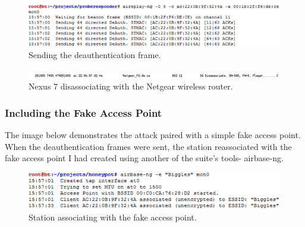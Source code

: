 \begin{figure}[h!]
\includegraphics[width=\linewidth]{research/attackvectors/figures/ddos-3.png}
\caption{Sending the deauthentication frame.}
\end{figure}

\begin{figure}[h!]
\includegraphics[width=\linewidth]{research/attackvectors/figures/ddos-4.png}
\caption{Nexus 7 disassociating with the Netgear wireless router.}
\end{figure}

\subsubsection*{Including the Fake Access Point}
The image below demonstrates the attack paired with a simple fake access point. When the deauthentication frames were sent, the station reassociated with the fake access point I had created using another of the suite’s tools- airbase-ng.

\begin{figure}[h!]
\includegraphics[width=\linewidth]{research/attackvectors/figures/ddos-5.png}
\caption{Station associating with the fake access point.}
\end{figure}